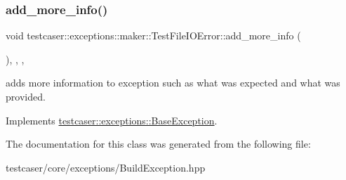 \subsubsection{\texorpdfstring{add\_more\_info()}{add\_more\_info()}}
{\footnotesize\ttfamily void testcaser\+::exceptions\+::maker\+::\+Test\+File\+I\+O\+Error\+::add\+\_\+more\+\_\+info (\begin{DoxyParamCaption}{ }\end{DoxyParamCaption})\hspace{0.3cm}{\ttfamily [inline]}, {\ttfamily [final]}, {\ttfamily [override]}, {\ttfamily [virtual]}}



adds more information to exception such as what was expected and what was provided. 



Implements \mbox{\hyperlink{classtestcaser_1_1exceptions_1_1BaseException_ad607ea04e2cb4ad9b8d0e2e6b6734f2f}{testcaser\+::exceptions\+::\+Base\+Exception}}.



The documentation for this class was generated from the following file\+:\begin{DoxyCompactItemize}
\item 
testcaser/core/exceptions/Build\+Exception.\+hpp\end{DoxyCompactItemize}
